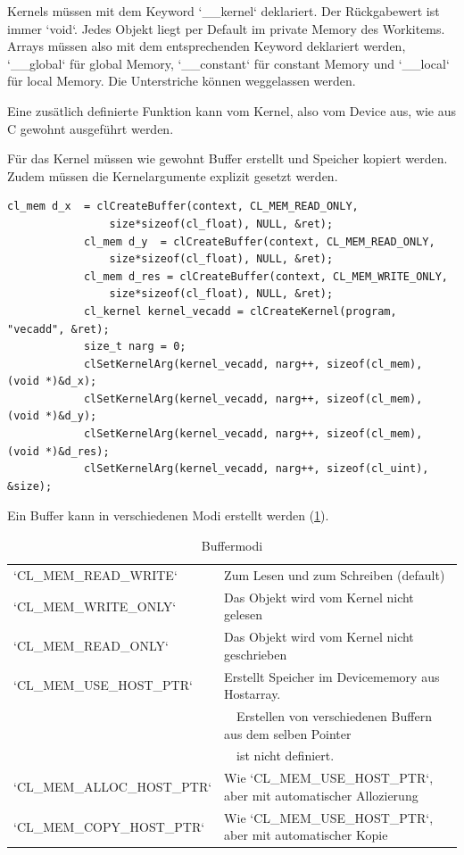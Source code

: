 			\Glspl{Kernel} müssen mit dem Keyword \li`__kernel` deklariert. Der Rückgabewert ist immer \li`void`. Jedes Objekt liegt per Default im \gls{private Memory} des \Glspl{Workitem}. Arrays müssen also mit dem entsprechenden Keyword deklariert werden, \li`__global` für \gls{global Memory}, \li`__constant` für \gls{constant Memory} und \li`__local` für \gls{local Memory}. Die Unterstriche können weggelassen werden. 
			
			Eine zusätlich definierte Funktion kann vom \Gls{Kernel}, also vom Device aus, wie aus C gewohnt ausgeführt werden. 
			
			Für das \Gls{Kernel} müssen wie gewohnt Buffer erstellt und Speicher kopiert werden. Zudem müssen die Kernelargumente explizit gesetzt werden.
			\begin{lstlisting}[caption=Kernelaufruf]
			cl_mem d_x  = clCreateBuffer(context, CL_MEM_READ_ONLY, 
				size*sizeof(cl_float), NULL, &ret);
			cl_mem d_y  = clCreateBuffer(context, CL_MEM_READ_ONLY, 
				size*sizeof(cl_float), NULL, &ret);
			cl_mem d_res = clCreateBuffer(context, CL_MEM_WRITE_ONLY, 
				size*sizeof(cl_float), NULL, &ret);
			cl_kernel kernel_vecadd = clCreateKernel(program, "vecadd", &ret);	
			size_t narg = 0;
			clSetKernelArg(kernel_vecadd, narg++, sizeof(cl_mem),  (void *)&d_x);
			clSetKernelArg(kernel_vecadd, narg++, sizeof(cl_mem),  (void *)&d_y);
			clSetKernelArg(kernel_vecadd, narg++, sizeof(cl_mem),  (void *)&d_res);
			clSetKernelArg(kernel_vecadd, narg++, sizeof(cl_uint), &size);
			\end{lstlisting}
			
			Ein Buffer kann in verschiedenen Modi erstellt werden (\ref{tab4:flags}).
			\begin{table}[h]
				\centering
				\begin{tabular}{|l|l|}\hline
				\li`CL_MEM_READ_WRITE` & Zum Lesen und zum Schreiben (default) \\
				\li`CL_MEM_WRITE_ONLY` & Das Objekt wird vom \Gls{Kernel} nicht gelesen \\	
				\li`CL_MEM_READ_ONLY`  & Das Objekt wird vom \Gls{Kernel} nicht geschrieben \\
				\li`CL_MEM_USE_HOST_PTR` & Erstellt Speicher im Devicememory aus Hostarray.\\
				                         & ~~Erstellen von verschiedenen Buffern aus dem selben Pointer\\
				                         & ~~ist nicht definiert.\\
				\li`CL_MEM_ALLOC_HOST_PTR` & Wie \li`CL_MEM_USE_HOST_PTR`, aber mit automatischer Allozierung \\
				\li`CL_MEM_COPY_HOST_PTR`  & Wie \li`CL_MEM_USE_HOST_PTR`, aber mit automatischer Kopie\\ \hline
				\end{tabular}
				\caption{Buffermodi}
				\label{tab4:flags}
			\end{table}
			
